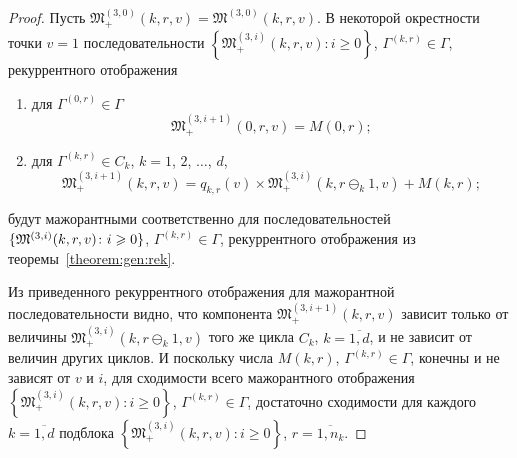 \begin{proof}
Пусть $\mathfrak{M}_+^{(3, 0)}(k, r, v) =\mathfrak{M}^{(3, 0)}(k, r, v)$. В некоторой окрестности точки  $v = 1$  последовательности $\left\{\mathfrak{M}_+^{(3, i)}(k, r, v)\colon i \geqslant 0\right\}$,  $\Gamma^{(k, r)} \in \Gamma$,  рекуррентного отображения 
\begin{enumerate}
\item для $ \Gamma^{(0, r)} \in \Gamma$ $$\mathfrak{M}_+^{(3, i+1)}(0, r, v) = M(0, r);$$
\item для $\Gamma^{(k,  r)} \in C_{k}$,   $k=1$,  $2$,  $\dots$,  $d$, 
$$\mathfrak{M}_+^{(3,  i+1)}(k, r, v) = q_{k, r} (v)\times  \mathfrak{M}_+^{(3, i)}(k, r \ominus_{k} 1, v) + M(k, r);$$
\end{enumerate}
будут мажорантными соответственно для последовательностей $\{\mathfrak{M}^{(3, i)}(k, r, v)\colon \hm{} i \geqslant 0\}$,  $\Gamma^{(k, r)} \in \Gamma$,  рекуррентного отображения из теоремы~\ref{theorem:gen:rek}.

Из приведенного рекуррентного отображения для мажорантной последовательности видно,  что компонента $\mathfrak{M}_+^{(3, i+1)}(k, r, v)$ зависит только от величины $\mathfrak{M}_+^{(3, i)}(k, r \ominus_{k} 1, v)$ того же цикла $C_k$,  $k=\overline{1, d}$,  и не зависит от величин других циклов. И поскольку числа $M(k, r)$,  $\Gamma^{(k, r)}\in \Gamma$,  конечны и не зависят от $v$ и $i$,  для сходимости всего мажорантного отображения $\left\{\mathfrak{M}_+^{(3, i)}(k, r, v)\colon i \geqslant 0\right\}$,  $\Gamma^{(k, r)} \in \Gamma$,  достаточно сходимости для каждого $k=\overline{1, d}$ подблока $\left\{\mathfrak{M}_+^{(3, i)}(k, r, v)\colon i \geqslant 0\right\}$,  $r =\overline{1, n_k}$. 


\end{proof}
